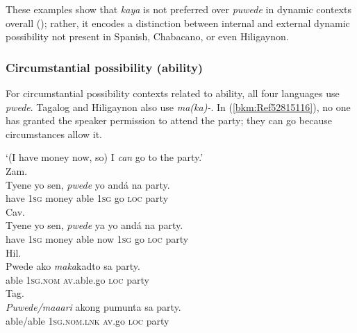 \documentclass[output=paper,colorlinks,citecolor=brown]{langscibook}
\begin{document}

\z
\z

These examples show that \textit{kaya} is not preferred over \textit{puwede} in dynamic contexts overall (\citealt[14]{AsarinaHolt2005}); rather, it encodes a distinction between internal and external dynamic possibility not present in Spanish, Chabacano, or even Hiligaynon.


\subsubsection{Circumstantial possibility (ability)}


For circumstantial possibility contexts related to ability, all four languages use \textit{pwede}. Tagalog and Hiligaynon also use \textit{ma(ka)-}. In (\ref{bkm:Ref52815116}), no one has granted the speaker permission to attend the party; they can go because circumstances allow it.

\ea
{\label{bkm:Ref52815116}‘(I have money now, so) I \textit{can} go to the party.’}\\
\ea
{Zam.}\\
\gll Tyene yo sen, \textit{pwede} yo andá na party.\\
     have \textsc{1sg} money able \textsc{1sg} go \textsc{loc} party\\
\ex
{Cav.}\\
\gll Tyene yo sen, \textit{pwede} ya yo andá na party.\\
     have \textsc{1sg} money able now \textsc{1sg} go \textsc{loc} party\\
\ex
{Hil.}\\
\gll Pwede ako \textit{maka}kadto sa party.\\
     able \textsc{1sg.nom} \textsc{av}.able.go \textsc{loc} party  \\
\ex
{Tag.}\\
\gll \textit{Puwede/maaari} akong pumunta sa party.\\
able/able \textsc{1sg.nom.lnk} \textsc{av}.go \textsc{loc} party\\
\z
\z
\end{document}
